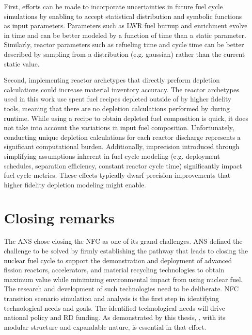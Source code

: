 First, efforts can be made to incorporate
uncertainties in future fuel cycle simulations by enabling
\Cyclus to accept statistical distribution and symbolic
functions as input parameters. Parameters such as \gls{LWR} fuel
burnup and enrichment evolve in time and can be better modeled
by a function of time than a static parameter. Similarly, reactor parameters
such as refueling time and cycle time can be better described by sampling
from a distribution (e.g. gaussian) rather than the current static
value.

Second, implementing reactor archetypes that directly
preform depletion calculations could increase material
inventory accuracy.
The reactor archetypes used in this work use spent fuel
recipes depleted outside of \Cyclus by higher fidelity tools,
meaning that there are no depletion calculations performed by
\Cyclus during runtime.
While using a recipe to obtain depleted fuel composition is quick,
it does not take into account the variations in input fuel composition.
Unfortunately, conducting unique depletion calculations for each reactor
discharge represents a significant computational burden.
Additionally, imprecision
introduced through simplifying assumptions inherent in fuel
cycle modeling (e.g. deployment schedules, separation efficiency,
constant reactor cycle time) significantly impact fuel cycle metrics.
These effects typically dwarf precision improvements that higher
fidelity depletion modeling might enable.

\section{Closing remarks}
The \gls{ANS} chose closing the \gls{NFC} as one of its grand challenges. \gls{ANS}
defined the challenge to be solved by firmly establishing the pathway that leads to closing
the nuclear fuel cycle to support the demonstration and deployment of
advanced fission reactors, accelerators, and material recycling technologies
to obtain maximum value while minimizing environmental impact 
from using nuclear fuel. The research and development of such technologies
need to be deliberate. \gls{NFC} transition scenario simulation and 
analysis is the first step in identifying technological needs
and goals. The identified technological needs will drive national
policy and \gls{RD} funding. As demonstrated by this thesis, \Cyclus, with its modular structure and expandable nature, is essential in that effort.

